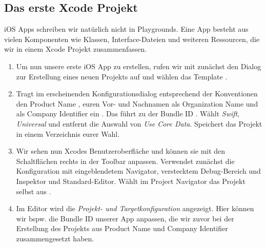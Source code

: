 \documentclass[parskip=half, final]{scrreprt}
\begin{document}
\begin{lecture} %


\section{Das erste Xcode Projekt}

iOS Apps schreiben wir natürlich nicht in Playgrounds. Eine App besteht aus vielen Komponenten wie Klassen, Interface-Dateien und weiteren Ressourcen, die wir in einem Xcode Projekt zusammenfassen.


\begin{enumerate}

\item Um nun unsere erste iOS App zu erstellen, rufen wir mit  zunächst den Dialog zur Erstellung eines neuen Projekts auf und wählen das Template .

\item Tragt im erscheinenden Konfigurationsdialog entsprechend der Konventionen den Product Name , euren Vor- und Nachnamen als Organization Name und  als Company Identifier ein . Das führt zu der Bundle ID . Wählt \emph{Swift}, \emph{Universal} und entfernt die Auswahl von \emph{Use Core Data}. Speichert das Projekt in einem Verzeichnis eurer Wahl.


\item Wir sehen nun Xcodes Benutzeroberfläche und können sie mit den Schaltflächen rechts in der Toolbar anpassen. Verwendet zunächst die Konfiguration mit eingeblendetem Navigator, verstecktem Debug-Bereich und Inspektor und Standard-Editor. Wählt im Project Navigator das Projekt selbst aus .


\item Im Editor wird die \emph{Projekt- und Targetkonfiguration} angezeigt. Hier können wir bspw. die Bundle ID unserer App anpassen, die wir zuvor bei der Erstellung des Projekts aus Product Name und Company Identifier zusammengesetzt haben.


\end{enumerate}
\end{lecture}
\end{document}
